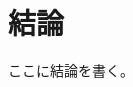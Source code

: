 \documentclass[12pt,a4paper,oneside,onecolumn,fleqn,dvipdfmx]{jreport}
\begin{document}
    \chapter{結論}
        ここに結論を書く。
\end{document}

